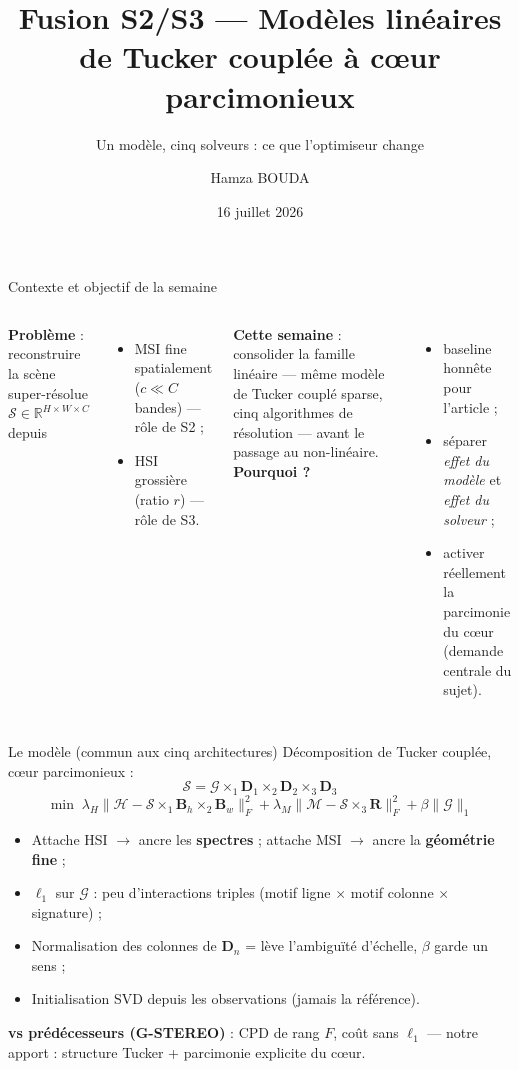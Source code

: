 \documentclass[10pt,aspectratio=169]{beamer}
\title[Modèles linéaires Tucker]{Fusion S2/S3 — Modèles linéaires de Tucker
couplée à c\oe ur parcimonieux}
\subtitle{Un modèle, cinq solveurs : ce que l'optimiseur change}
\author{Hamza BOUDA}
\institute{LISIC — ULCO \\ Point hebdomadaire d'équipe}
\date{16 juillet 2026}
\newcommand{\T}[1]{\bm{\mathcal{#1}}}
\newcommand{\M}[1]{\bm{#1}}
\begin{document}
\begin{frame}
  \titlepage
\end{frame}

\begin{frame}{Contexte et objectif de la semaine}
\begin{columns}
\textbf{Problème} : reconstruire la scène super-résolue
$\T{S}\in\mathbb{R}^{H\times W\times C}$ depuis
\begin{itemize}
  \item MSI fine spatialement ($c \ll C$ bandes) — rôle de S2 ;
  \item HSI grossière (ratio $r$) — rôle de S3.
\end{itemize}
\medskip
\textbf{Cette semaine} : consolider la \alert{famille linéaire} —
même modèle de Tucker couplé sparse, \alert{cinq algorithmes de résolution}
— avant le passage au non-linéaire.
\textbf{Pourquoi ?}
\begin{itemize}
  \item baseline honnête pour l'article ;
  \item séparer \emph{effet du modèle} et \emph{effet du solveur} ;
  \item activer réellement la parcimonie du c\oe ur (demande centrale
        du sujet).
\end{itemize}
\end{columns}
\end{frame}

\begin{frame}{Le modèle (commun aux cinq architectures)}
Décomposition de Tucker couplée, c\oe ur parcimonieux :
\begin{equation*}
  \T{S} = \T{G}\times_1\M{D}_1\times_2\M{D}_2\times_3\M{D}_3
\end{equation*}
\begin{equation*}
\boxed{
  \min\;
  \lambda_H\bigl\lVert\T{H} - \T{S}\times_1\M{B}_h\times_2\M{B}_w\bigr\rVert_F^2
  + \lambda_M\bigl\lVert\T{M} - \T{S}\times_3\M{R}\bigr\rVert_F^2
  + \beta\lVert\T{G}\rVert_1}
\end{equation*}
\begin{itemize}
  \item Attache HSI $\to$ ancre les \textbf{spectres} ;
        attache MSI $\to$ ancre la \textbf{géométrie fine} ;
  \item $\ell_1$ sur $\T{G}$ : peu d'interactions triples
        (motif ligne $\times$ motif colonne $\times$ signature) ;
  \item Normalisation des colonnes de $\M{D}_n$ = lève l'ambiguïté
        d'échelle, $\beta$ garde un sens ;
  \item Initialisation SVD depuis les observations (jamais la référence).
\end{itemize}
\medskip
\textbf{vs prédécesseurs (G-STEREO)} : CPD de rang $F$, coût sans
$\ell_1$ — notre apport : structure Tucker \alert{+} parcimonie explicite
du c\oe ur.
\end{frame}
\end{document}
